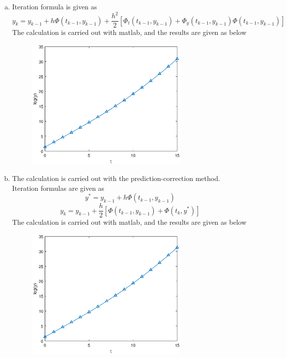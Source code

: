 \documentclass[paper=a4, fontsize=11pt]{scrartcl} %
\numberwithin{equation}{section} %
\numberwithin{figure}{section} %
\numberwithin{table}{section} %
\begin{document}
\begin{enumerate}[(a)]
\begin{figure}[!htbp]
			\end{figure}
		\item 
			Iteration formula is given as 
			\begin{equation}
				y_k = y_{k-1} + h \Phi(t_{k-1}, y_{k-1}) + \frac{h^2}{2}[\Phi_t(t_{k-1}, y_{k-1}) + \Phi_y(t_{k-1}, y_{k-1}) \Phi(t_{k-1}, y_{k-1})]
			\end{equation}
			The calculation is carried out with matlab, and the results are given as below
			\begin{figure}[!htbp]
				\centering
				\includegraphics[width=8cm]{../pic/Q3_c.eps}
			\end{figure}
		\item 
			The calculation is carried out with the prediction-correction method. Iteration formulas are given as
			\begin{equation}
				y^* = y_{k-1} + h \Phi(t_{k-1}, y_{k-1})
			\end{equation}
			\begin{equation}
				y_k = y_{k-1} + \frac{h}{2} [\Phi(t_{k-1}, y_{k-1}) + \Phi(t_k, y^*)] 
			\end{equation}
			The calculation is carried out with matlab, and the results are given as below
			\begin{figure}[!htbp]
				\centering
				\includegraphics[width=8cm]{../pic/Q3_d.eps}

\end{figure}
\end{enumerate}
\end{document}
